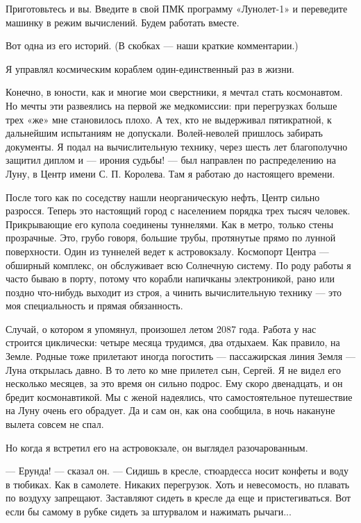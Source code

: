 \documentclass[11pt,a4paper,oneside]{article}
\begin{document}
Приготовьтесь и вы. Введите в свой ПМК программу «Лунолет-1» и переведите машинку в режим вычислений. Будем работать вместе.

Вот одна из его историй. (В скобках — наши краткие комментарии.)

Я управлял космическим кораблем один-единственный раз в жизни.

Конечно, в юности, как и многие мои сверстники, я мечтал стать космонавтом. Но мечты эти развеялись на первой же медкомиссии: при перегрузках больше трех «же» мне становилось плохо. А тех, кто не выдерживал пятикратной, к дальнейшим испытаниям не допускали. Волей-неволей пришлось забирать документы. Я подал на вычислительную технику, через шесть лет благополучно защитил диплом и — ирония судьбы! — был направлен по распределению на Луну, в Центр имени С. П. Королева. Там я работаю до настоящего времени.

После того как по соседству нашли неорганическую нефть, Центр сильно разросся. Теперь это настоящий город с населением порядка трех тысяч человек. Прикрывающие его купола соединены туннелями. Как в метро, только стены прозрачные. Это, грубо говоря, большие трубы, протянутые прямо по лунной поверхности. Один из туннелей ведет к астровокзалу. Космопорт Центра — обширный комплекс, он обслуживает всю Солнечную систему. По роду работы я часто бываю в порту, потому что корабли напичканы электроникой, рано или поздно что-нибудь выходит из строя, а чинить вычислительную технику — это моя специальность и прямая обязанность.

Случай, о котором я упомянул, произошел летом 2087 года. Работа у нас строится циклически: четыре месяца трудимся, два отдыхаем. Как правило, на Земле. Родные тоже прилетают иногда погостить — пассажирская линия Земля — Луна открылась давно. В то лето ко мне прилетел сын, Сергей. Я не видел его несколько месяцев, за это время он сильно подрос. Ему скоро двенадцать, и он бредит космонавтикой. Мы с женой надеялись, что самостоятельное путешествие на Луну очень его обрадует. Да и сам он, как она сообщила, в ночь накануне вылета совсем не спал.

Но когда я встретил его на астровокзале, он выглядел разочарованным.

— Ерунда! — сказал он. — Сидишь в кресле, стюардесса носит конфеты и воду в тюбиках. Как в самолете. Никаких перегрузок. Хоть и невесомость, но плавать по воздуху запрещают. Заставляют сидеть в кресле да еще и пристегиваться. Вот если бы самому в рубке сидеть за штурвалом и нажимать рычаги...
\end{document}
